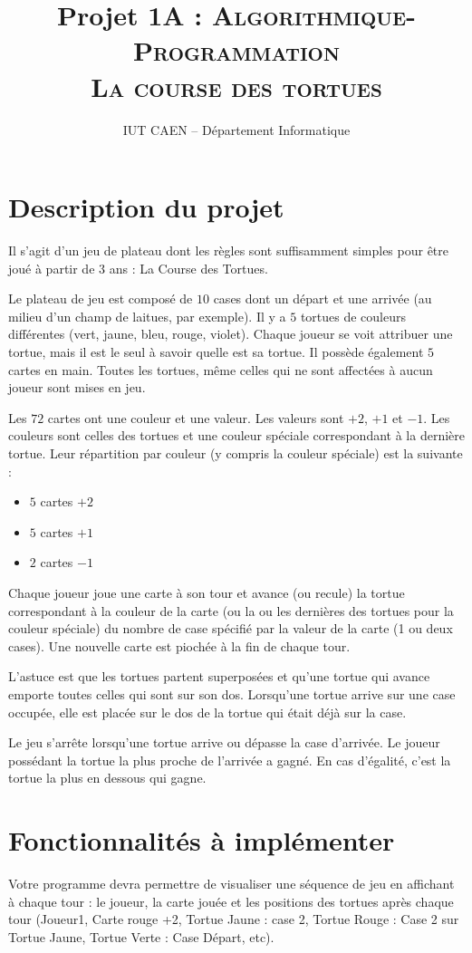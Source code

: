 \documentclass[10pt]{article}
\title{Projet 1A : \textsc{Algorithmique-Programmation \\ La course des tortues }}
\author{IUT CAEN -- Département Informatique}
\begin{document}
\maketitle

\pagestyle{empty}

\section{Description du projet}

Il s'agit d'un jeu de plateau dont les règles sont suffisamment
simples pour être joué à partir de 3 ans : La Course des Tortues.

Le plateau de jeu est composé de $10$ cases dont un départ et une
arrivée (au milieu d'un champ de laitues, par exemple). Il y a $5$
tortues de couleurs différentes (vert, jaune, bleu, rouge, violet).
Chaque joueur se voit attribuer une tortue, mais il est le seul à
savoir quelle est sa tortue. Il possède également $5$ cartes en main.
Toutes les tortues, même celles qui ne sont affectées à aucun
joueur sont mises en jeu.

Les $72$ cartes ont une couleur et une valeur. Les valeurs sont $+2$, $+1$
et $-1$. Les couleurs sont celles des tortues et une couleur spéciale
correspondant à la dernière tortue. Leur répartition par couleur (y
compris la couleur spéciale) est la suivante :
\begin{itemize}
\item $5$ cartes $+2$
\item  $5$ cartes $+1$
\item $2$ cartes $-1$
\end{itemize}
Chaque joueur joue une carte à son tour et avance (ou recule) la
tortue correspondant à la couleur de la carte (ou la ou les dernières
des tortues pour la couleur spéciale) du nombre de case spécifié
par la valeur de la carte (1 ou deux cases). Une nouvelle carte est
piochée à la fin de chaque tour.

L'astuce est que les tortues partent superposées et qu'une tortue qui
avance emporte toutes celles qui sont sur son dos. Lorsqu'une tortue
arrive sur une case occupée, elle est placée sur le dos de la tortue
qui était déjà sur la case.

Le jeu s'arrête lorsqu'une tortue arrive ou dépasse la case
d'arrivée. Le joueur possédant la tortue la plus proche de
l'arrivée a gagné. En cas d'égalité, c'est la tortue la plus en
dessous qui gagne.

\section{Fonctionnalités à implémenter}
Votre programme devra permettre de visualiser une séquence de jeu
en affichant à chaque tour : le joueur, la carte jouée et les
positions des tortues après chaque tour (Joueur1, Carte rouge +2,
Tortue Jaune : case 2, Tortue Rouge : Case 2 sur Tortue Jaune, Tortue
Verte : Case Départ, etc).
\end{document}
